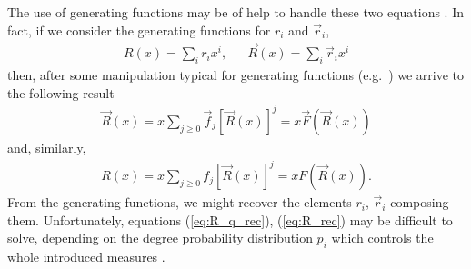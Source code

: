 \documentclass[10pt, conference, compsocconf]{IEEEtran}
\begin{document}
The use of generating functions may be of help to handle these two equations \cite{Wilf_1994}. In fact, if we consider the generating functions for $r_i$ and $\overrightarrow{r}_i$,
\begin{eqnarray}\label{eq:R} R(x) = \sum_i r_i x^i, & & \overrightarrow{R}(x) = \sum_i \overrightarrow{r}_i x^i
\end{eqnarray}
then, after some manipulation typical for generating functions (e.g.~\cite{newmanHandbook}) we arrive to the following result
\begin{eqnarray}\label{eq:R_q_rec} 
  \overrightarrow{R}(x)  =  x \sum_{j \geq 0} \overrightarrow{f}_j [\overrightarrow{R}(x)]^j
     =  x \overrightarrow{F}(\overrightarrow{R}(x))
\end{eqnarray}
and, similarly,
\begin{eqnarray}\label{eq:R_rec} 
  R(x)  =  x \sum_{j \geq 0} f_j [\overrightarrow{R}(x)]^j
     =  x F(\overrightarrow{R}(x)).
\end{eqnarray}
From the generating functions, we might recover the elements $r_i$, $\overrightarrow{r}_i$ composing them. Unfortunately, equations (\ref{eq:R_q_rec}), (\ref{eq:R_rec}) may be difficult to solve, depending on the degree probability distribution $p_i$ which controls the whole introduced measures \cite{newmanHandbook}.
\end{document}
